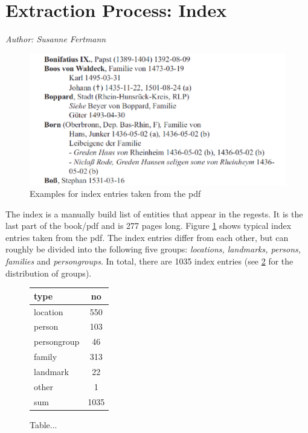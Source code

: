 \section{Extraction Process: Index}
\label{sec:index}

\emph{Author: Susanne Fertmann} \\

\begin{figure}[h]
  \centering
  \includegraphics[scale=0.3]{img/index-examples}
  \caption{Examples for index entries taken from the pdf}
  \label{fig:index-examples}
\end{figure}
The index is a manually build list of entities that appear in the regests. It is the last part of the book/pdf and is 277 pages long. Figure \ref{fig:index-examples} shows typical index entries taken from the pdf. The index entries differ from each other, but can roughly be divided into the following five groups: \textit{locations, landmarks, persons, families} and \textit{persongroups}. In total, there are 1035 index entries (see \ref{fig:type-table} for the distribution of groups). 

\begin{figure}[h]
\centering
\begin{tabular}{|l|c|}
\hline
type        & no  \\
\hline
location    & 550 \\
person      & 103 \\
persongroup & 46  \\
family      & 313 \\
landmark    & 22  \\
other       & 1   \\
\hline
sum         & 1035\\
\hline
\end{tabular} 
\caption{Table...}
\label{fig:type-table}
\end{figure}

